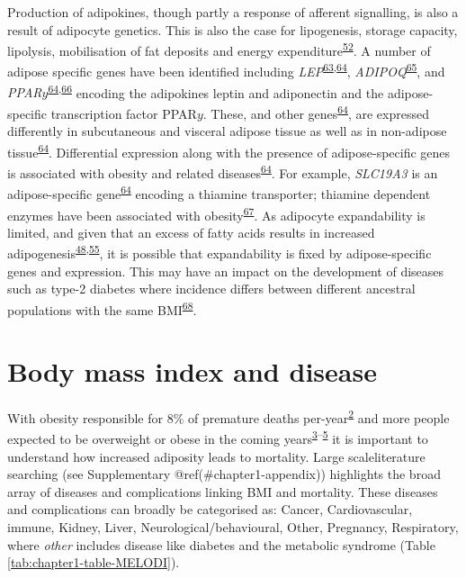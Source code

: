 \documentclass[11pt,twoside]{bristolthesis}
\begin{document}
Production of adipokines, though partly a response of afferent signalling, is also a result of adipocyte genetics. This is also the case for lipogenesis, storage capacity, lipolysis, mobilisation of fat deposits and energy expenditure\textsuperscript{\protect\hyperlink{ref-Dahlman2010}{52}}. A number of adipose specific genes have been identified including \emph{LEP}\textsuperscript{\protect\hyperlink{ref-Pan2018}{63},\protect\hyperlink{ref-Ahn2019}{64}}, \emph{ADIPOQ}\textsuperscript{\protect\hyperlink{ref-Achari2017}{65}}, and \emph{PPAR\(y\)}\textsuperscript{\protect\hyperlink{ref-Ahn2019}{64},\protect\hyperlink{ref-Lefterova2009}{66}} encoding the adipokines leptin and adiponectin and the adipose-specific transcription factor PPAR\(y\). These, and other genes\textsuperscript{\protect\hyperlink{ref-Ahn2019}{64}}, are expressed differently in subcutaneous and visceral adipose tissue as well as in non-adipose tissue\textsuperscript{\protect\hyperlink{ref-Ahn2019}{64}}. Differential expression along with the presence of adipose-specific genes is associated with obesity and related diseases\textsuperscript{\protect\hyperlink{ref-Ahn2019}{64}}. For example, \emph{SLC19A3} is an adipose-specific gene\textsuperscript{\protect\hyperlink{ref-Ahn2019}{64}} encoding a thiamine transporter; thiamine dependent enzymes have been associated with obesity\textsuperscript{\protect\hyperlink{ref-Maguire2018}{67}}. As adipocyte expandability is limited, and given that an excess of fatty acids results in increased adipogenesis\textsuperscript{\protect\hyperlink{ref-Frayn2003}{48},\protect\hyperlink{ref-Gray2007}{55}}, it is possible that expandability is fixed by adipose-specific genes and expression. This may have an impact on the development of diseases such as type-2 diabetes where incidence differs between different ancestral populations with the same BMI\textsuperscript{\protect\hyperlink{ref-Ma2013a}{68}}.

\hypertarget{BMI-and-disease}{%
\section{Body mass index and disease}\label{BMI-and-disease}}

With obesity responsible for 8\% of premature deaths per-year\textsuperscript{\protect\hyperlink{ref-Stanaway2018}{2}} and more people expected to be overweight or obese in the coming years\textsuperscript{\protect\hyperlink{ref-Ng2014}{3}--\protect\hyperlink{ref-Abarca-Gomez2017}{5}} it is important to understand how increased adiposity leads to mortality. Large scaleliterature searching (see Supplementary @ref(\#chapter1-appendix)) highlights the broad array of diseases and complications linking BMI and mortality. These diseases and complications can broadly be categorised as: Cancer, Cardiovascular, immune, Kidney, Liver, Neurological/behavioural, Other, Pregnancy, Respiratory, where \emph{other} includes disease like diabetes and the metabolic syndrome (Table \ref{tab:chapter1-table-MELODI}).
\end{document}
